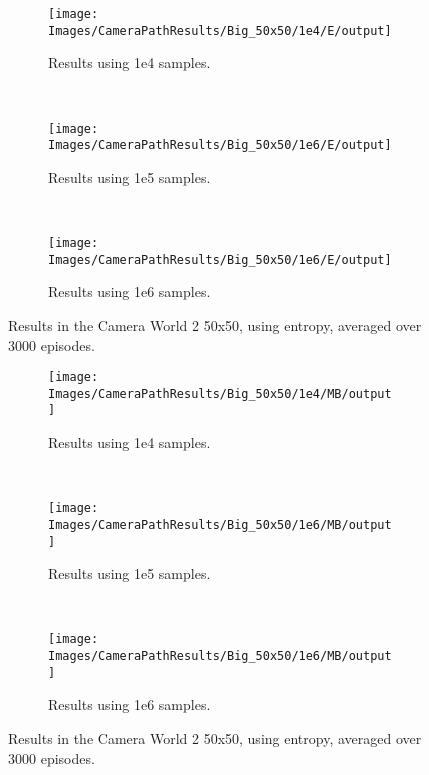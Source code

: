 \begin{figure}[ht]
        \centering
        \begin{subfigure}[t]{0.3\textwidth}
                \texttt{[image: Images/CameraPathResults/Big\_50x50/1e4/E/output]}
                \caption{Results using 1e4 samples.}
                \label{fig:cpb4e}
        \end{subfigure}%
        ~ %
        \begin{subfigure}[t]{0.3\textwidth}
                \texttt{[image: Images/CameraPathResults/Big\_50x50/1e6/E/output]}
                \caption{Results using 1e5 samples.}
                \label{fig:cpb5e}
        \end{subfigure}
        ~ %
        \begin{subfigure}[t]{0.3\textwidth}
                \texttt{[image: Images/CameraPathResults/Big\_50x50/1e6/E/output]}
                \caption{Results using 1e6 samples.}
                \label{fig:cpb6e}
        \end{subfigure}
        \caption{Results in the Camera World 2 50x50, using entropy, averaged over 3000 episodes.}\label{fig:cpbe}
\end{figure}

\begin{figure}[ht]
        \centering
        \begin{subfigure}[t]{0.3\textwidth}
                \texttt{[image: Images/CameraPathResults/Big\_50x50/1e4/MB/output]}
                \caption{Results using 1e4 samples.}
                \label{fig:cpb4mb}
        \end{subfigure}%
        ~ %
        \begin{subfigure}[t]{0.3\textwidth}
                \texttt{[image: Images/CameraPathResults/Big\_50x50/1e6/MB/output]}
                \caption{Results using 1e5 samples.}
                \label{fig:cpb5mb}
        \end{subfigure}
        ~ %
        \begin{subfigure}[t]{0.3\textwidth}
                \texttt{[image: Images/CameraPathResults/Big\_50x50/1e6/MB/output]}
                \caption{Results using 1e6 samples.}
                \label{fig:cpb6mb}
        \end{subfigure}
        \caption{Results in the Camera World 2 50x50, using entropy, averaged over 3000 episodes.}\label{fig:cpbmb}
\end{figure}

